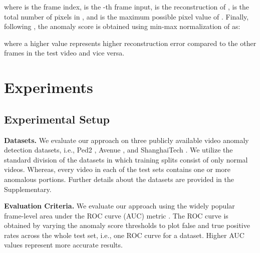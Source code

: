 \documentclass{bmvc2k}
\begin{document}
where  is the frame index,  is the -th frame input,  is the reconstruction of ,  is the total number of pixels in , and  is the maximum possible pixel value of . 
Finally, following \cite{park2020learning,liu2018future,dong2020dual}, the anomaly score  is obtained using min-max normalization of  as:

where a higher  value represents higher reconstruction error compared to the other frames in the test video and vice versa.



\vspace{-3mm}
\section{Experiments}
\label{sec:experiments}
\vspace{-2mm}




\vspace{-1mm}
\subsection{Experimental Setup}
\label{subsec:experimentalsetup}
\vspace{-1mm}
\noindent\textbf{Datasets.} We evaluate our approach on three publicly available video anomaly detection datasets, i.e., Ped2 \cite{li2013anomaly}, Avenue \cite{lu2013abnormal}, and ShanghaiTech \cite{luo2017revisit}. We utilize the standard division of the datasets in which training splits consist of only normal videos. Whereas, every video in each of the test sets contains one or more anomalous portions. Further details about the datasets are provided in the Supplementary.

\noindent\textbf{Evaluation Criteria.}
We evaluate our approach using the widely popular frame-level area under the ROC curve (AUC) metric \cite{zaheer2020old}. The ROC curve is obtained by varying the anomaly score thresholds to plot false and true positive rates across the whole test set, i.e., one ROC curve for a dataset. Higher AUC values represent more accurate results.
\end{document}
